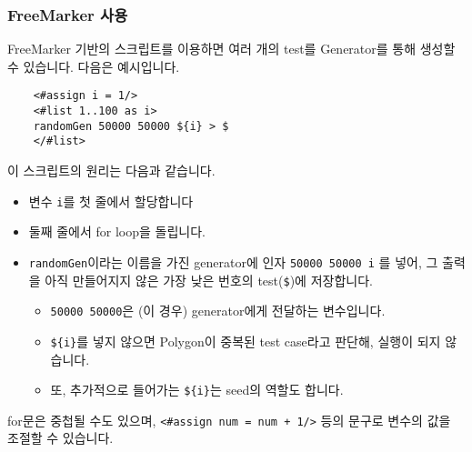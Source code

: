 \documentclass{article}
\begin{document}
    \subsubsection{FreeMarker 사용}
    FreeMarker 기반의 스크립트를 이용하면 여러 개의 test를 Generator를 통해 생성할 수 있습니다. 다음은 예시입니다.
    \begin{verbatim}
    <#assign i = 1/>
    <#list 1..100 as i>
    randomGen 50000 50000 ${i} > $
    </#list>\end{verbatim}
    이 스크립트의 원리는 다음과 같습니다.
    \begin{itemize}
        \item 변수 \verb|i|를 첫 줄에서 할당합니다
        \item 둘째 줄에서 for loop을 돌립니다.
        \item \verb|randomGen|이라는 이름을 가진 generator에 인자 \verb|50000 50000 i| 를 넣어, 그 출력을 아직 만들어지지 않은 가장 낮은 번호의 test(\verb|$|)에 저장합니다.
        \begin{itemize}
            \item \verb|50000 50000|은 (이 경우) generator에게 전달하는 변수입니다.
            \item \verb|${i}|를 넣지 않으면 Polygon이 중복된 test case라고 판단해, 실행이 되지 않습니다.
            \item  또, 추가적으로 들어가는 \verb|${i}|는 seed의 역할도 합니다.
        \end{itemize}
    \end{itemize}
    for문은 중첩될 수도 있으며, \verb|<#assign num = num + 1/>| 등의 문구로 변수의 값을 조절할 수 있습니다.
\end{document}
